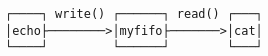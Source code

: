 \documentclass[varwidth,crop]{standalone}
\begin{document}
\begin{verbatim}
┌────┐ write() ┌──────┐ read() ┌───┐
│echo├────────>│myfifo├───────>│cat│
└────┘         └──────┘        └───┘
\end{verbatim}
\end{document}
